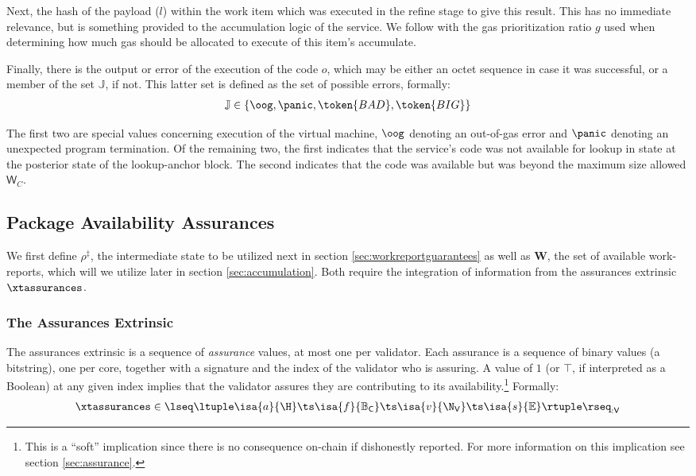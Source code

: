 Next, the hash of the payload ($l$) within the work item which was executed in the refine stage to give this result. This has no immediate relevance, but is something provided to the accumulation logic of the service. We follow with the gas prioritization ratio $g$ used when determining how much gas should be allocated to execute of this item's accumulate.

Finally, there is the output or error of the execution of the code $o$, which may be either an octet sequence in case it was successful, or a member of the set $\mathbb{J}$, if not. This latter set is defined as the set of possible errors, formally:
\begin{align}
  \mathbb{J} \in \{ \oog, \panic, \token{BAD}, \token{BIG} \}
\end{align}

The first two are special values concerning execution of the virtual machine, $\oog$ denoting an out-of-gas error and $\panic$ denoting an unexpected program termination. Of the remaining two, the first indicates that the service's code was not available for lookup in state at the posterior state of the lookup-anchor block. The second indicates that the code was available but was beyond the maximum size allowed $\mathsf{W}_C$.









\subsection{Package Availability Assurances}

We first define $\rho^\ddagger$, the intermediate state to be utilized next in section \ref{sec:workreportguarantees} as well as $\mathbf{W}$, the set of available work-reports, which will we utilize later in section \ref{sec:accumulation}. Both require the integration of information from the assurances extrinsic $\xtassurances$.

\subsubsection{The Assurances Extrinsic}
The assurances extrinsic is a sequence of \emph{assurance} values, at most one per validator. Each assurance is a sequence of binary values (\ie a bitstring), one per core, together with a signature and the index of the validator who is assuring. A value of $1$ (or $\top$, if interpreted as a Boolean) at any given index implies that the validator assures they are contributing to its availability.\footnote{This is a ``soft'' implication since there is no consequence on-chain if dishonestly reported. For more information on this implication see section \ref{sec:assurance}.} Formally:
\begin{align}
  \xtassurances \in \lseq\ltuple\isa{a}{\H}\ts\isa{f}{\mathbb{B}_\mathsf{C}}\ts\isa{v}{\N_\mathsf{V}}\ts\isa{s}{\mathbb{E}}\rtuple\rseq_\mathsf{:V}
\end{align}

